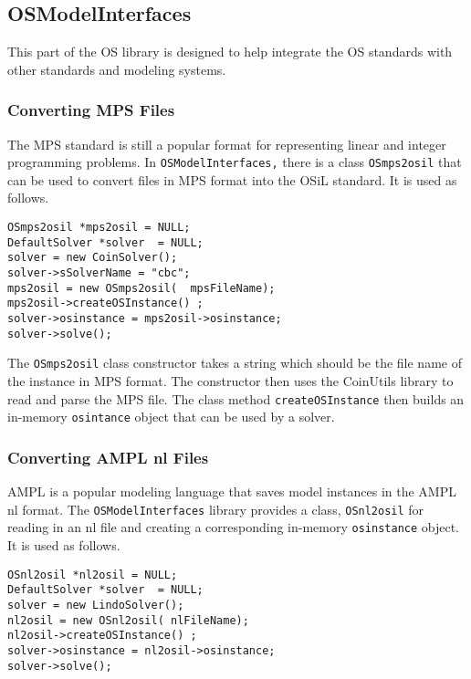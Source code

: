\documentclass[11pt]{article}
\renewcommand{\_}{{\char"5F}}
\renewcommand{\{}{{\char"7B}}
\renewcommand{\}}{{\char"7D}}
\renewcommand{\^}{{\char"0D}}
\renewcommand{\'}{{\char"0D}}
\begin{document}
\subsection{OSModelInterfaces}\label{section:osmodelinterfaces}

This part of the OS library is designed to help integrate the OS standards with other standards and modeling systems.

\subsubsection{Converting MPS Files}

The MPS standard is still a popular format for representing linear and integer programming problems.  In {\tt OSModelInterfaces,} there is a class {\tt OSmps2osil} that can be used to convert files in MPS format into the OSiL standard. It is used as follows.

\begin{verbatim}
OSmps2osil *mps2osil = NULL;
DefaultSolver *solver  = NULL;
solver = new CoinSolver();
solver->sSolverName = "cbc";
mps2osil = new OSmps2osil(  mpsFileName);
mps2osil->createOSInstance() ;
solver->osinstance = mps2osil->osinstance;
solver->solve();
\end{verbatim}

The {\tt OSmps2osil} class constructor takes a string which should be the file name of the instance in MPS format. The constructor then uses the CoinUtils library to read and parse the MPS file.  The class method {\tt createOSInstance} then builds  an in-memory {\tt osintance} object  that can be used by a solver.


\subsubsection{Converting AMPL nl Files}\label{section:nl2osil}

AMPL is a popular modeling language that saves  model instances in the AMPL nl format.  The {\tt OSModelInterfaces} library provides a class, {\tt OSnl2osil} for reading in an nl file and creating a corresponding in-memory  {\tt osinstance} object. It is used as follows.

\begin{verbatim}
OSnl2osil *nl2osil = NULL;
DefaultSolver *solver  = NULL;
solver = new LindoSolver();
nl2osil = new OSnl2osil( nlFileName);
nl2osil->createOSInstance() ;
solver->osinstance = nl2osil->osinstance;	
solver->solve();
\end{verbatim}
\end{document}
